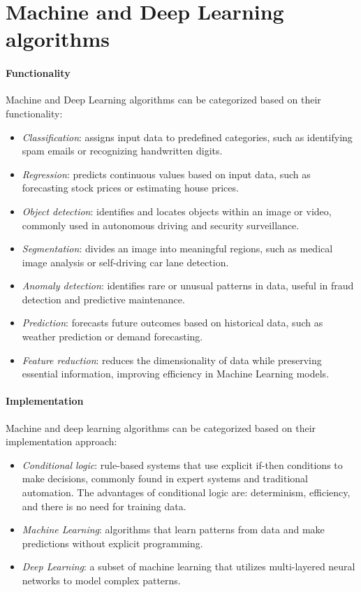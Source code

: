 \section{Machine and Deep Learning algorithms}

\paragraph*{Functionality}
Machine and Deep Learning algorithms can be categorized based on their functionality:  
\begin{itemize}
    \item \textit{Classification}: assigns input data to predefined categories, such as identifying spam emails or recognizing handwritten digits.
    \item \textit{Regression}: predicts continuous values based on input data, such as forecasting stock prices or estimating house prices.
    \item \textit{Object detection}: identifies and locates objects within an image or video, commonly used in autonomous driving and security surveillance.
    \item \textit{Segmentation}: divides an image into meaningful regions, such as medical image analysis or self-driving car lane detection.
    \item \textit{Anomaly detection}: identifies rare or unusual patterns in data, useful in fraud detection and predictive maintenance.
    \item \textit{Prediction}: forecasts future outcomes based on historical data, such as weather prediction or demand forecasting.
    \item \textit{Feature reduction}: reduces the dimensionality of data while preserving essential information, improving efficiency in Machine Learning models.
\end{itemize}

\paragraph*{Implementation}
Machine and deep learning algorithms can be categorized based on their implementation approach:  
\begin{itemize}
    \item \textit{Conditional logic}: rule-based systems that use explicit if-then conditions to make decisions, commonly found in expert systems and traditional automation.
        The advantages of conditional logic are: determinism, efficiency, and there is no need for training data. 
    \item \textit{Machine Learning}: algorithms that learn patterns from data and make predictions without explicit programming.
    \item \textit{Deep Learning}: a subset of machine learning that utilizes multi-layered neural networks to model complex patterns.
\end{itemize}

